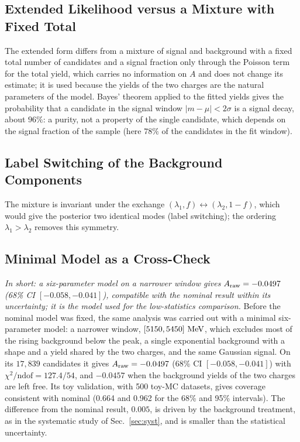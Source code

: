 \subsection{Extended Likelihood versus a Mixture with Fixed Total}
The extended form differs from a mixture of signal and background with a fixed total number of candidates and a signal fraction only through the Poisson term for the total yield, which carries no information on $A$ and does not change its estimate; it is used because the yields of the two charges are the natural parameters of the model. Bayes' theorem applied to the fitted yields gives the probability that a candidate in the signal window $|m-\mu|<2\sigma$ is a signal decay, about $96\%$: a purity, not a property of the single candidate, which depends on the signal fraction of the sample (here $78\%$ of the candidates in the fit window).

\subsection{Label Switching of the Background Components}
The mixture is invariant under the exchange $(\lambda_1,f)\leftrightarrow(\lambda_2,1-f)$, which would give the posterior two identical modes (label switching); the ordering $\lambda_1>\lambda_2$ removes this symmetry.

\subsection{Minimal Model as a Cross-Check}
\label{sec:bayes_minimal}
\emph{In short: a six-parameter model on a narrower window gives $A_{\mathrm{raw}}=-0.0497$ (68\% CI $[-0.058,-0.041]$), compatible with the nominal result within its uncertainty; it is the model used for the low-statistics comparison.}
Before the nominal model was fixed, the same analysis was carried out with a minimal six-parameter model: a narrower window, $[5150,5450]\,\,\text{Me\hspace{-.08em}V}$, which excludes most of the rising background below the peak, a single exponential background with a shape and a yield shared by the two charges, and the same Gaussian signal. On its $17{,}839$ candidates it gives $A_{\mathrm{raw}}=-0.0497$ (68\% CI $[-0.058,-0.041]$) with $\chi^2/\text{ndof}=127.4/54$, and $-0.0457$ when the background yields of the two charges are left free. Its toy validation, with 500 toy-MC datasets, gives coverage consistent with nominal (0.664 and 0.962 for the 68\% and 95\% intervals). The difference from the nominal result, $0.005$, is driven by the background treatment, as in the systematic study of Sec.~\ref{sec:syst}, and is smaller than the statistical uncertainty.

